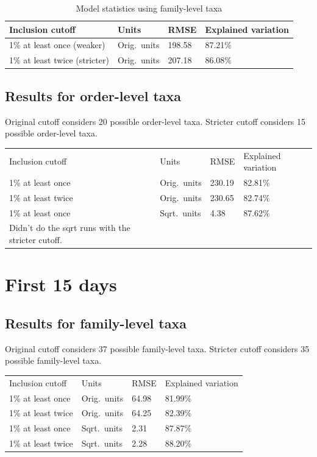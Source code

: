 \documentclass{article}
\begin{document}
\begin{table}
  \centering
\caption{\label{tbl:family_all_data_model_stats}Model statistics using family-level taxa}
\begin{tabular}{llll}
Inclusion cutoff & Units  & RMSE & Explained variation\\ \hline
1\% at least once (weaker)  & Orig.~units & 198.58 & 87.21\%\\
1\% at least twice (stricter) & Orig.~units & 207.18 & 86.08\% %
\end{tabular}
\end{table}


\subsection{Results for order-level taxa}

Original cutoff considers 20 possible order-level taxa.
Stricter cutoff considers 15 possible order-level taxa.

\begin{tabular}{llll}
Inclusion cutoff & Units  & RMSE & Explained variation\\
1\% at least once  & Orig.~units & 230.19 & 82.81\%\\
1\% at least twice & Orig.~units & 230.65 & 82.74\%\\
1\% at least once  & Sqrt.~units &   4.38 & 87.62\%\\
Didn't do the sqrt runs with the stricter cutoff.
\end{tabular}




\section{First 15 days}

\subsection{Results for family-level taxa}

Original cutoff considers 37 possible family-level taxa.
Stricter cutoff considers 35 possible family-level taxa.

\begin{tabular}{llll}
Inclusion cutoff & Units  & RMSE & Explained variation\\
1\% at least once  & Orig.~units & 64.98 & 81.99\%\\
1\% at least twice & Orig.~units & 64.25 & 82.39\%\\
1\% at least once  & Sqrt.~units & 2.31 & 87.87\%\\
1\% at least twice & Sqrt.~units & 2.28 & 88.20\%
\end{tabular}
\end{document}
